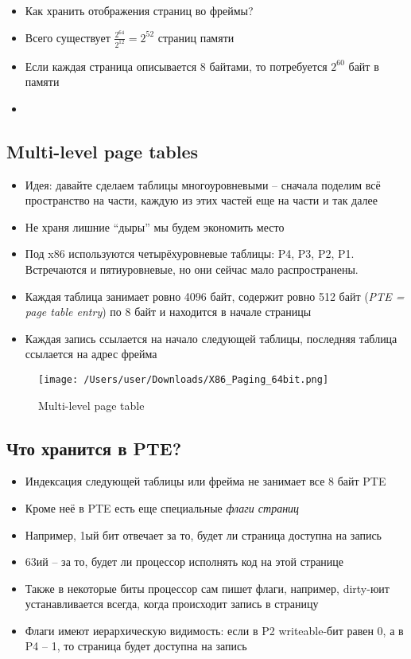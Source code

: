     \begin{itemize}
      \item Как хранить отображения страниц во фреймы?
      \item Всего существует $\frac{2^{64}}{2^{12}} = 2^{52}$ страниц памяти
      \item Если каждая страница описывается 8 байтами, то потребуется $2^60$ байт в памяти
      \item {}
    \end{itemize}
  
  \subsection{Multi-level page tables}
    \begin{itemize}
      \item Идея: давайте сделаем таблицы многоуровневыми -- сначала поделим всё пространство на части, каждую из этих частей еще на части и так далее
      \item Не храня лишние ``дыры'' мы будем экономить место
      \item Под x86 используются четырёхуровневые таблицы: P4, P3, P2, P1. Встречаются и пятиуровневые, но они сейчас мало распространены.
      \item Каждая таблица занимает ровно 4096 байт, содержит ровно 512 байт (\textit{PTE = page table entry}) по 8 байт и находится в начале страницы
      \item Каждая запись ссылается на начало следующей таблицы, последняя таблица ссылается на адрес фрейма
    \end{itemize}
    
\begin{figure}[h!]
  \texttt{[image: /Users/user/Downloads/X86\_Paging\_64bit.png]}
  \caption{Multi-level page table}
  \label{fig:page_table}
\end{figure}  
  
  \subsection{Что хранится в PTE?}
    \begin{itemize}
      \item Индексация следующей таблицы или фрейма не занимает все 8 байт PTE
      \item Кроме неё в PTE есть еще специальные \textit{флаги страниц}
      \item Например, 1ый бит отвечает за то, будет ли страница доступна на запись
      \item 63ий -- за то, будет ли процессор исполнять код на этой странице
      \item Также в некоторые биты процессор сам пишет флаги, например, dirty-юит устанавливается всегда, когда происходит запись в страницу
      \item Флаги имеют иерархическую видимость: если в P2 writeable-бит равен 0, а в P4 -- 1, то страница будет доступна на запись
    \end{itemize}
  
